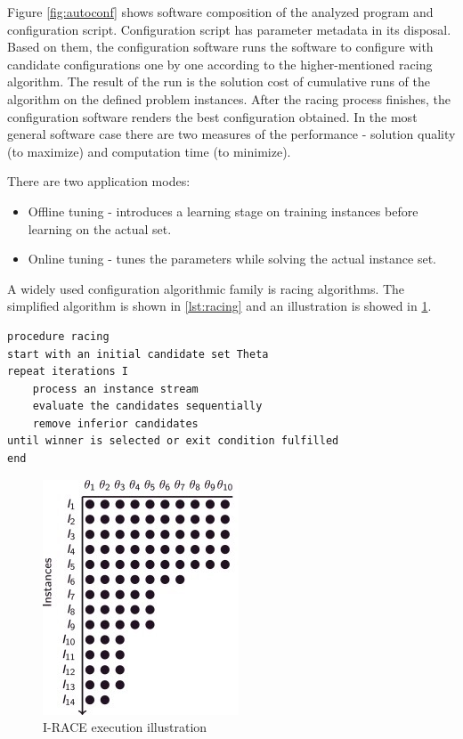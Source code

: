 \documentclass[12pt]{article}
\begin{document}
Figure \ref{fig:autoconf} shows software composition of the analyzed program and configuration script. Configuration script has parameter metadata in its disposal. Based on them, the configuration software runs the software to configure with candidate configurations one by one according to the higher-mentioned racing algorithm. The result of the run is the solution cost of cumulative runs of the algorithm on the defined problem instances. After the racing process finishes, the configuration software renders the best configuration obtained. In the most general software case there are two measures of the performance - solution quality (to maximize) and computation time (to minimize).

There are two application modes:
\begin{itemize}
\item Offline tuning - introduces a learning stage on training instances before learning on the actual set.
\item Online tuning - tunes the parameters while solving the actual instance set.
\end{itemize}

A widely used configuration algorithmic family is racing algorithms. The simplified algorithm is shown in \ref{lst:racing} and an illustration is showed in \ref{fig:irace}.


\begin{minipage}[c, breaklines=true]{0.95\textwidth}
\begin{lstlisting}[caption={General racing pseudo-code}, label={lst:racing}]
procedure racing
start with an initial candidate set Theta
repeat iterations I
	process an instance stream
	evaluate the candidates sequentially
	remove inferior candidates
until winner is selected or exit condition fulfilled
end
\end{lstlisting}
\end{minipage}

\begin{figure}[H]
  \centering
    \includegraphics[scale=1.2]{irace.jpg}
  \caption{I-RACE execution illustration}
  \label{fig:irace}
\end{figure}
\end{document}
